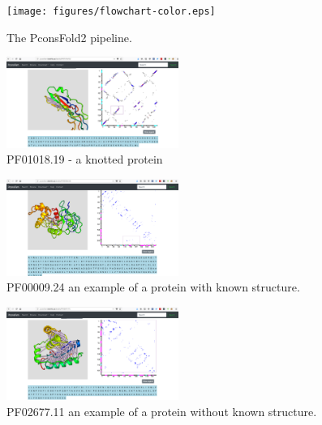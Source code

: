 \documentclass[a4,center,fleqn]{NAR}
\begin{document}
\begin{figure}[t]
\begin{center}
\end{center}
    \texttt{[image: figures/flowchart-color.eps]}
\caption{The PconsFold2 pipeline.}
\label{fig:pipeline}
\end{figure}




\begin{figure}[t]
\begin{center}
    \includegraphics[width=0.5\textwidth]{figures/PF01018-pconsfam.png}
\end{center}
\caption{PF01018.19 - a knotted protein}
\label{fig:PF01018}
\end{figure}


\begin{figure}[t]
\begin{center}
    \includegraphics[width=0.5\textwidth]{figures/PF00009-pconsfam.png}
\end{center}
\caption{PF00009.24 an example of a protein with known structure.}
\label{fig:PF00009}
\end{figure}


\begin{figure}[t]
\begin{center}
    \includegraphics[width=0.5\textwidth]{figures/PF02677-pconsfam.png}
\end{center}
\caption{PF02677.11 an example of a protein without known structure.}
\label{fig:PF02677}
\end{figure}
\end{document}
